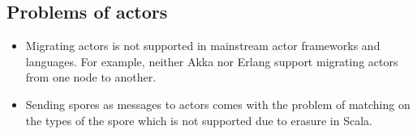 \documentclass{llncs}
\begin{document}









\subsection{Problems of actors}

\begin{itemize}

\item Migrating actors is not supported in mainstream actor frameworks and
languages. For example, neither Akka nor Erlang support migrating actors from
one node to another.

\item Sending spores as messages to actors comes with the problem of matching
on the types of the spore which is not supported due to erasure in Scala.

\end{itemize}
\end{document}
